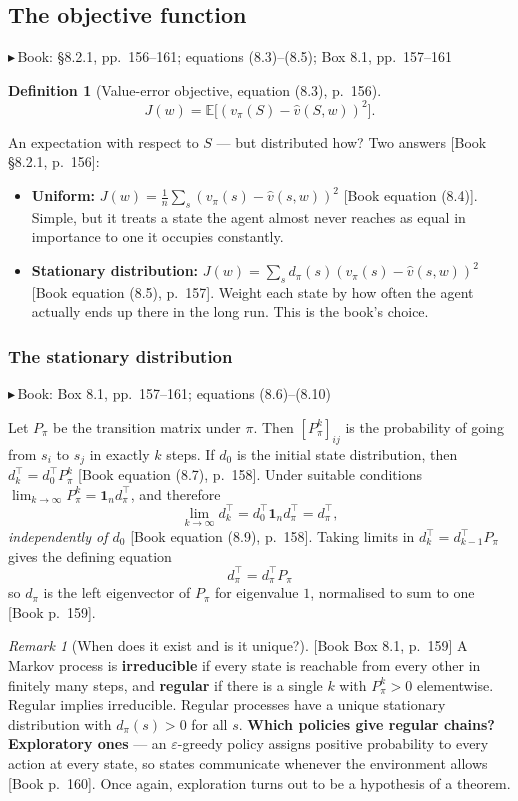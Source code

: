 \documentclass[11pt, letterpaper]{article}
\theoremstyle{runin}
\newtheorem*{definition}{Definition}
\theoremstyle{runinplain}
\theoremstyle{remark}
\newtheorem*{remark}{Remark}
\newcommand{\E}{\mathbb{E}}
\newcommand{\bk}[1]{{\color{bookblue}\small$\blacktriangleright$\,\textsf{Book: #1}}}
\newcommand{\bkin}[1]{{\color{bookblue}\small[\textsf{Book #1}]}}
\begin{document}
\subsection{The objective function}

\bk{\S8.2.1, pp.~156--161; equations (8.3)--(8.5); Box 8.1, pp.~157--161}

\begin{definition}[Value-error objective, equation (8.3), p.~156]
\[
  J(w)=\E\bigl[(v_\pi(S)-\hat v(S,w))^2\bigr].
\]
\end{definition}

An expectation with respect to $S$ --- but distributed how? Two answers
\bkin{\S8.2.1, p.~156}:

\begin{itemize}
  \item \textbf{Uniform:} $J(w)=\frac1n\sum_s(v_\pi(s)-\hat v(s,w))^2$
        \bkin{equation (8.4)}. Simple, but it treats a state the agent almost never
        reaches as equal in importance to one it occupies constantly.
  \item \textbf{Stationary distribution:}
        $J(w)=\sum_s d_\pi(s)(v_\pi(s)-\hat v(s,w))^2$ \bkin{equation (8.5), p.~157}.
        Weight each state by how often the agent actually ends up there in the long
        run. This is the book's choice.
\end{itemize}

\subsubsection{The stationary distribution}

\bk{Box 8.1, pp.~157--161; equations (8.6)--(8.10)}

Let $P_\pi$ be the transition matrix under $\pi$. Then $[P_\pi^k]_{ij}$ is the
probability of going from $s_i$ to $s_j$ in exactly $k$ steps. If $d_0$ is the
initial state distribution, then $d_k^{\!\top}=d_0^{\!\top}P_\pi^k$
\bkin{equation (8.7), p.~158}. Under suitable conditions
$\lim_{k\to\infty}P_\pi^k=\mathbf 1_nd_\pi^{\!\top}$, and therefore
\[
  \lim_{k\to\infty}d_k^{\!\top}=d_0^{\!\top}\mathbf 1_nd_\pi^{\!\top}=d_\pi^{\!\top},
\]
\emph{independently of $d_0$} \bkin{equation (8.9), p.~158}. Taking limits in
$d_k^{\!\top}=d_{k-1}^{\!\top}P_\pi$ gives the defining equation
\[
  \boxed{\;d_\pi^{\!\top}=d_\pi^{\!\top}P_\pi\;}
  \tag{8.10}
\]
so $d_\pi$ is the left eigenvector of $P_\pi$ for eigenvalue $1$, normalised to sum
to one \bkin{p.~159}.

\begin{remark}[When does it exist and is it unique?]
\bkin{Box 8.1, p.~159} A Markov process is \textbf{irreducible} if every state is
reachable from every other in finitely many steps, and \textbf{regular} if there is
a single $k$ with $P_\pi^k>0$ elementwise. Regular implies irreducible. Regular
processes have a unique stationary distribution with $d_\pi(s)>0$ for all $s$.
\textbf{Which policies give regular chains? Exploratory ones} --- an
$\varepsilon$-greedy policy assigns positive probability to every action at every
state, so states communicate whenever the environment allows \bkin{p.~160}. Once
again, exploration turns out to be a hypothesis of a theorem.
\end{remark}
\end{document}
